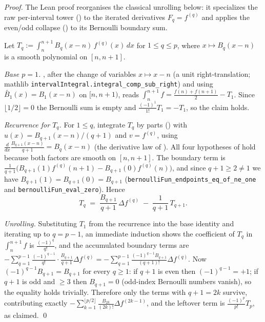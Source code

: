 \begin{proof}
\leanok
{}
The Lean proof reorganises the classical unrolling below: it specializes the raw
per-interval tower () to the iterated derivatives
$F_q = f^{(q)}$ and applies the even/odd collapse ()
to its Bernoulli boundary sum.

Let $T_q := \int_n^{n+1} B_q(x-n)\,f^{(q)}(x)\,dx$ for $1 \le q \le p$, where
$x \mapsto B_q(x-n)$ is a smooth polynomial on $[n,n+1]$.

\emph{Base $p=1$.} , after the change of variables $x \mapsto x-n$
(a unit right-translation; mathlib \texttt{intervalIntegral.integral\_comp\_sub\_right})
and using $\widetilde{B_1}(x)=B_1(x-n)$ on $[n,n+1)$, reads
$\int_n^{n+1} f = \tfrac{f(n)+f(n+1)}{2} - T_1$. Since $\lfloor 1/2\rfloor = 0$ the
Bernoulli sum is empty and $\tfrac{(-1)^1}{1!}T_1 = -T_1$, so the claim holds.

\emph{Recurrence for $T_q$.} For $1 \le q$, integrate $T_q$ by parts
() with $u(x) = B_{q+1}(x-n)/(q+1)$ and $v = f^{(q)}$, using
$\frac{d}{dx}\frac{B_{q+1}(x-n)}{q+1} = B_q(x-n)$ (the derivative law of
). All four hypotheses of  hold because both
factors are smooth on $[n,n+1]$. The boundary term is
$\frac{1}{q+1}\bigl(B_{q+1}(1) f^{(q)}(n+1) - B_{q+1}(0) f^{(q)}(n)\bigr)$, and since
$q+1 \ge 2 \neq 1$ we have $B_{q+1}(1) = B_{q+1}(0) = B_{q+1}$
(\texttt{bernoulliFun\_endpoints\_eq\_of\_ne\_one} and \texttt{bernoulliFun\_eval\_zero}).
Hence
\[
  T_q \;=\; \frac{B_{q+1}}{q+1}\,\Delta f^{(q)} \;-\; \frac{1}{q+1}\,T_{q+1}.
\]

\emph{Unrolling.} Substituting $T_1$ from the recurrence into the base identity and
iterating up to $q = p-1$, an immediate induction shows the coefficient of $T_q$ in
$\int_n^{n+1} f$ is $\frac{(-1)^q}{q!}$, and the accumulated boundary terms are
$-\sum_{q=1}^{p-1}\frac{(-1)^{q-1}}{q!}\cdot\frac{B_{q+1}}{q+1}\Delta f^{(q)}
 = -\sum_{q=1}^{p-1}\frac{(-1)^{q-1}B_{q+1}}{(q+1)!}\Delta f^{(q)}$.
Now $(-1)^{q-1}B_{q+1} = B_{q+1}$ for every $q \ge 1$: if $q+1$ is even then
$(-1)^{q-1} = +1$; if $q+1$ is odd and $\ge 3$ then $B_{q+1} = 0$
(odd-index Bernoulli numbers vanish), so the equality holds trivially. Therefore
only the terms with $q+1 = 2k$ survive, contributing exactly
$-\sum_{k=1}^{\lfloor p/2\rfloor}\frac{B_{2k}}{(2k)!}\Delta f^{(2k-1)}$, and the
leftover term is $\frac{(-1)^p}{p!}T_p$, as claimed. \qed
\end{proof}

